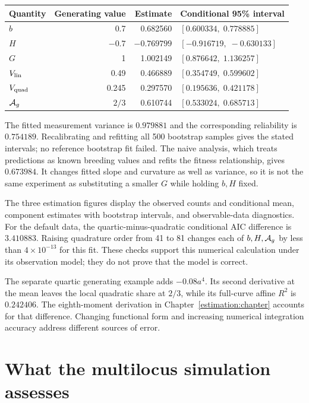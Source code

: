 \begin{center}
\small
\begin{tabular}{@{}lrrl@{}}
\toprule Quantity & Generating value & Estimate & Conditional 95\% interval\\
\midrule
$b$ &0.7&0.682560&$[0.600334,\;0.778885]$\\
$H$ &$-0.7$&$-0.769799$&$[-0.916719,\;-0.630133]$\\
$G$ &1&1.002149&$[0.876642,\;1.136257]$\\
$V_{\mathrm{lin}}$ &0.49&0.466889&$[0.354749,\;0.599602]$\\
$V_{\mathrm{quad}}$ &0.245&0.297570&$[0.195636,\;0.421178]$\\
$\mathcal A_g$ &$2/3$&0.610744&$[0.533024,\;0.685713]$\\
\bottomrule
\end{tabular}
\end{center}
The fitted measurement variance is $0.979881$ and the corresponding reliability is $0.754189$. Recalibrating and refitting all 500 bootstrap samples gives the stated intervals; no reference bootstrap fit failed. The naive analysis, which treats predictions as known breeding values and refits the fitness relationship, gives $0.673984$. It changes fitted slope and curvature as well as variance, so it is not the same experiment as substituting a smaller $G$ while holding $b,H$ fixed.

The three estimation figures display the observed counts and conditional mean, component estimates with bootstrap intervals, and observable-data diagnostics. For the default data, the quartic-minus-quadratic conditional AIC difference is $3.410883$. Raising quadrature order from 41 to 81 changes each of $b,H,\mathcal A_g$ by less than $4\times10^{-13}$ for this fit. These checks support this numerical calculation under its observation model; they do not prove that the model is correct.

The separate quartic generating example adds $-0.08a^4$. Its second derivative at the mean leaves the local quadratic share at $2/3$, while its full-curve affine $R^2$ is $0.242406$. The eighth-moment derivation in Chapter~\ref{estimation:chapter} accounts for that difference. Changing functional form and increasing numerical integration accuracy address different sources of error.

\section{What the multilocus simulation assesses}
\label{worked:simulation}

